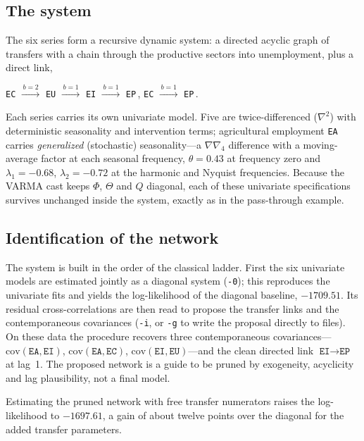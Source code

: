\documentclass[11pt,a4paper]{article}
\theoremstyle{plain}
\theoremstyle{remark}
\begin{document}
\subsection{The system}

The six series form a recursive dynamic system: a directed acyclic graph of
transfers with a chain through the productive sectors into unemployment, plus a
direct link,
\begin{center}
\texttt{EC} $\xrightarrow{\,b=2\,}$ \texttt{EU} $\xrightarrow{\,b=1\,}$
\texttt{EI} $\xrightarrow{\,b=1\,}$ \texttt{EP}\,,
\qquad
\texttt{EC} $\xrightarrow{\,b=1\,}$ \texttt{EP}\,.
\end{center}
Each series carries its own univariate model. Five are twice-differenced ($\nabla^2$)
with deterministic seasonality and intervention terms; agricultural employment
\texttt{EA} carries \emph{generalized} (stochastic) seasonality---a
$\nabla\nabla_4$ difference with a moving-average factor at each seasonal frequency,
$\theta=0.43$ at frequency zero and $\lambda_1=-0.68$, $\lambda_2=-0.72$ at the
harmonic and Nyquist frequencies. Because the VARMA cast keeps $\Phi$, $\Theta$ and
$Q$ diagonal, each of these univariate specifications survives unchanged inside the
system, exactly as in the pass-through example.

\subsection{Identification of the network}

The system is built in the order of the classical ladder. First the six univariate
models are estimated jointly as a diagonal system (\texttt{-0}); this reproduces the
univariate fits and yields the log-likelihood of the diagonal baseline,
$-1709.51$. Its residual cross-correlations are then read to propose the transfer
links and the contemporaneous covariances (\texttt{-i}, or \texttt{-g} to write the
proposal directly to files). On these data the procedure recovers three
contemporaneous covariances---$\mathrm{cov}(\texttt{EA},\texttt{EI})$,
$\mathrm{cov}(\texttt{EA},\texttt{EC})$, $\mathrm{cov}(\texttt{EI},\texttt{EU})$---and
the clean directed link $\texttt{EI}\rightarrow\texttt{EP}$ at lag~1. The proposed
network is a guide to be pruned by exogeneity, acyclicity and lag plausibility, not a
final model.

Estimating the pruned network with free transfer numerators raises the
log-likelihood to $-1697.61$, a gain of about twelve points over the diagonal for
the added transfer parameters.
\end{document}
